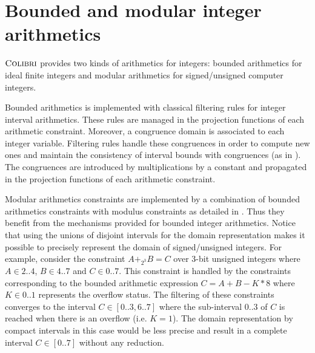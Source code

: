 \documentclass[a4paper]{article}
\newcommand{\COLIBRI}{\ensuremath{\mbox{\scshape Colibri}}\xspace}
\begin{document}
\section{Bounded and modular integer arithmetics}\label{SubsecColibriIntArithmetics}
\COLIBRI{} provides two kinds of arithmetics for integers: bounded arithmetics for ideal
finite integers and modular arithmetics for signed/unsigned computer integers.

Bounded arithmetics is implemented with classical filtering rules for integer interval arithmetics.
These rules are managed in the projection functions of each
arithmetic constraint.
Moreover, a congruence domain is associated to each integer variable.
Filtering rules handle these congruences in order to compute new
ones and maintain the consistency of interval bounds with
congruences (as in \cite{LeconteB06}).
The congruences are introduced by multiplications by a constant
and propagated in the projection functions of each arithmetic constraint.



Modular arithmetics constraints are implemented by a combination of
bounded arithmetics constraints with modulus constraints as detailed in
\cite{GotliebLM10}. Thus they benefit from the mechanisms provided for bounded integer
arithmetics. Notice that using the unions of disjoint intervals for the domain
representation makes it possible to precisely represent the domain of
signed/unsigned integers. For example, consider the constraint $A +_{2^3} B = C$ over 3-bit
unsigned integers where $A \in 2..4$, $B \in 4..7$ and $C \in 0..7$.
This constraint is handled by the constraints corresponding to the bounded
arithmetic expression $C = A + B - K * 8$
where $K \in 0..1$ represents the overflow status.
The filtering of these constraints converges to the interval $C \in [0..3, 6..7]$
where the sub-interval $0..3$ of $C$ is reached when there is an overflow (i.e. $K = 1$).
The domain representation by compact intervals in this case would be less precise and
result in a complete interval $C \in [0..7]$ without any reduction.

\end{document}

